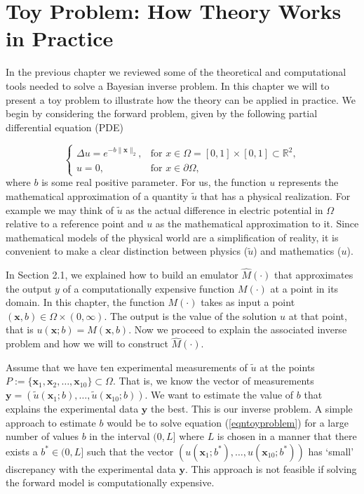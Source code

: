 \documentclass{sfuthesis}
\newcommand{\x}{\textbf{x}}
\newcommand{\y}{\textbf{y}}
\begin{document}
\chapter{Toy Problem: How Theory Works in Practice}

In the previous chapter we reviewed some  of the theoretical and computational tools needed to solve
a Bayesian inverse problem. In this chapter
we will to present  a toy problem to illustrate how the theory  can be applied in practice.
We begin by considering the forward problem, given by the following partial differential equation (PDE)

\begin{equation}\label{eqntoyproblem}
\left\{
	\begin{array}{ll}
		\Delta u=e^{-b\|\x\|_{2}}, &\mbox{for } x\in\Omega=[0,1]\times [0,1]\subset\mathbb{R}^{2}, \\
		u=0, & \mbox{for } x\in\partial\Omega,
	\end{array}
\right.
\end{equation} 
where $b$ is some real positive parameter. For us, the 
function $u$ represents the mathematical approximation of  a quantity $\tilde{u}$ that has a physical realization. 
For example we may think of $\tilde{u}$ as the actual difference in  electric potential in $\Omega$ relative to a reference point
and $u$ as the mathematical approximation to it. Since mathematical models of the physical world are a simplification
of  reality, it is convenient to make a clear distinction between physics ($\tilde{u}$) and mathematics ($u$).

In  Section 2.1, we explained how to build an emulator $\hat{M}(\cdot)$  that approximates
the output $y$  of a computationally expensive function  $M(\cdot)$ at a point  in its domain. 
In  this chapter, the function $M(\cdot)$ takes as input a point  $(\textbf{x},b)\in\Omega\times(0,\infty)$. The
output is the value of the solution $u$ at that 
point, that is $u(\textbf{x};b)=M(\textbf{x},b)$. Now we proceed to explain the associated inverse problem and  how we will to construct $\hat{M}(\cdot)$.  

Assume that we have ten experimental measurements 
of $\tilde{u}$ at the points $P:=\{\x_{1},\x_{2},\ldots,\x_{10}\}\subset\Omega$. 
That is, we know the vector of measurements 
$\textbf{y}=(\tilde{u}(\x_{1};b),\ldots,\tilde{u}(\x_{10};b))$.
We want to estimate the value of $b$ that explains  the experimental data $\textbf{y}$ the best. 
This is our inverse problem. 
A simple approach to estimate $b$ 
would be to solve equation (\ref{eqntoyproblem}) for a large number of values $b$ in the interval $(0,L]$ where $L$ 
is chosen in a manner that there exists a $b^{*}\in (0,L]$ such that the vector 
$(u(\x_{1};b^{*}),\ldots,u(\x_{10};b^{*}))$
has `small' discrepancy with the experimental data $\y$. This approach is not feasible if solving the forward
model is computationally expensive. 
\end{document}
